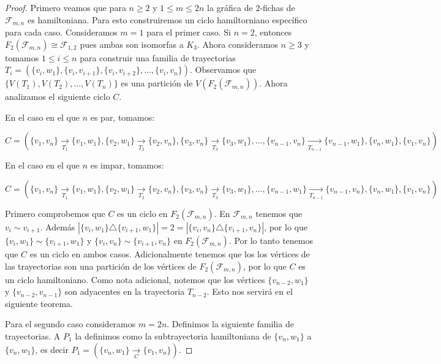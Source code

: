 \begin{proof}
    Primero veamos que para $n \geq 2$ y $1 \leq m \leq 2n$ la gr\'afica de
    $2$-fichas de $\mathcal{F}_{m,n}$ es hamiltoniana. Para esto construiremos un ciclo
    hamiltorniano espec\'ifico para cada caso. Consideramos $m=1$ para el primer
    caso. Si $n=2$, entonces $F_2(\mathcal{F}_{m,n}) \cong \mathcal{F}_{1,2}$ pues ambas son
    isomorfas a $K_3$. Ahora consideramos $n \geq 3$ y tomamos $1 \leq i \leq n$
    para construir una familia de trayectorias
    $T_i=(\{v_i,w_1\},\{v_i,v_{i+1}\},\{v_i,v_{i+2}\},\dots, \{v_i,v_n\})$. Observamos
    que $\{V(T_1),V(T_2),\dots, V(T_n)\}$ es una partici\'on de
    $V(F_2(\mathcal{F}_{m,n}))$. %
    Ahora analizamos el siguiente ciclo $C$.
    
    En el caso en el que $n$ es par, tomamos:

    $C=(\{v_1,v_n\} \xrightarrow[T_1]{}\{v_1,w_1\},\{v_2,w_1\}
    \xrightarrow[T_2]{}\{v_2,v_n\},\{v_3,v_n\} \xrightarrow[T_3]{}\{v_3,w_1\},
    \dots, \{v_{n-1},v_n\}
    \xrightarrow[T_{n-1}]{}\{v_{n-1},w_1\},\{v_n,w_1\},\{v_1,v_n\})$

    En el caso en el que $n$ es impar, tomamos:

    $C=(\{v_1,v_n\} \xrightarrow[T_1]{}\{v_1,w_1\},\{v_2,w_1\}
    \xrightarrow[T_2]{}\{v_2,v_n\},\{v_3,v_n\} \xrightarrow[T_3]{}\{v_3,w_1\},
    \dots, \{v_{n-1},w_1\}
    \xrightarrow[T_{n-1}]{}\{v_{n-1},v_n\},\{v_n,w_1\},\{v_1,v_n\})$

    Primero comprobemos que $C$ es un ciclo en $F_2(\mathcal{F}_{m,n})$. En $\mathcal{F}_{m,n}$
    tenemos que $v_i \sim v_{i+1}$. Adem\'as $|\{v_i,w_1\}\triangle
    \{v_{i+1},w_1\}|=2 =|\{v_i,v_n\}\triangle \{v_{i+1},v_n\}|$, por lo que
    $\{v_i,w_1\}\sim \{v_{i+1},w_1\}$ y $\{v_i,v_n\}\sim \{v_{i+1},v_n\}$ en
    $F_2(\mathcal{F}_{m,n})$. Por lo tanto tenemos que $C$ es un ciclo en ambos casos.
    Adicionalmente tenemos que los los v\'ertices de las trayectorias son una
    partici\'on de los v\'ertices de $F_2(\mathcal{F}_{m,n})$, por lo que $C$ es un ciclo
    hamiltoniano. Como nota adicional, notemos que los v\'ertices
    $\{v_{n-2},w_1\}$ y $\{v_{n-2},v_{n-1}\}$ son adyacentes en la trayectoria
    $T_{n-2}$. Esto nos servir\'a en el siguiente teorema.

    Para el segundo caso consideramos $m=2n$. Definimos la siguiente familia de
    trayectorias. A $P_1$ la definimos como la subtrayectoria hamiltoniana de
    $\{v_n,w_1\}$ a $\{v_n,w_1\}$, es decir $P_1= (\{v_n,w_1\}
    \xrightarrow[C]{}\{v_1,v_n\})$. 
    

\end{proof}
